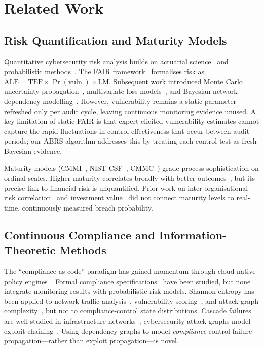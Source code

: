 \documentclass[conference]{IEEEtran}
\newcommand{\ALE}{\mathrm{ALE}}
\newcommand{\TEF}{\mathrm{TEF}}
\newcommand{\LM}{\mathrm{LM}}
\begin{document}
\section{Related Work}
\label{sec:related}

\subsection{Risk Quantification and Maturity Models}
Quantitative cybersecurity risk analysis builds on actuarial science~\cite{Gordon2002} and probabilistic methods~\cite{Kaplan1981}. The FAIR framework~\cite{Jones2005} formalises risk as $\ALE = \TEF \times \Pr(\text{vuln.}) \times \LM$. Subsequent work introduced Monte Carlo uncertainty propagation~\cite{Hubbard2016}, multivariate loss models~\cite{Biener2015}, and Bayesian network dependency modelling~\cite{Fielder2016,Neil2016,Poolsappasit2012}. However, vulnerability remains a static parameter refreshed only per audit cycle, leaving continuous monitoring evidence unused. A key limitation of static FAIR is that expert-elicited vulnerability estimates cannot capture the rapid fluctuations in control effectiveness that occur between audit periods; our ABRS algorithm addresses this by treating each control test as fresh Bayesian evidence.

Maturity models (CMMI~\cite{CMMI2018}, NIST CSF~\cite{NIST2018}, CMMC~\cite{CMMC2021}) grade process sophistication on ordinal scales. Higher maturity correlates broadly with better outcomes~\cite{Benz2020,Lund2017}, but its precise link to financial risk is unquantified. Prior work on inter-organisational risk correlation~\cite{Bohme2006} and investment value~\cite{Cavusoglu2004} did not connect maturity levels to real-time, continuously measured breach probability.

\subsection{Continuous Compliance and Information-Theoretic Methods}
The ``compliance as code'' paradigm has gained momentum through cloud-native policy engines~\cite{Compliance2023}. Formal compliance specifications~\cite{Dekker2007,Strembeck2011} have been studied, but none integrate monitoring results with probabilistic risk models. Shannon entropy has been applied to network traffic analysis~\cite{Lakhina2004}, vulnerability scoring~\cite{Wang2008}, and attack-graph complexity~\cite{Ou2006}, but not to compliance-control state distributions. Cascade failures are well-studied in infrastructure networks~\cite{Buldyrev2010}; cybersecurity attack graphs model exploit chaining~\cite{Sheyner2002,Ammann2002}. Using dependency graphs to model \emph{compliance} control failure propagation---rather than exploit propagation---is novel.
\end{document}
